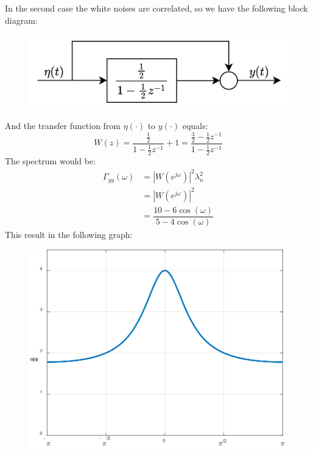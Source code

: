 In the second case the white noises are correlated, so we have the following block diagram: 
\begin{figure}[H]
    \centering
    \includegraphics[width=0.5\linewidth]{images/21block.png}
\end{figure}
And the transfer function from $\eta(\cdot)$ to $y(\cdot)$ equals:
\[W(z)=\dfrac{\frac{1}{2}}{1-\frac{1}{2}z^{-1}}+1=\dfrac{\frac{3}{2}-\frac{1}{2}z^{-1}}{1-\frac{1}{2}z^{-1}}\]
The spectrum would be: 
\begin{align*}
    \Gamma_{yy}(\omega) &=\left\lvert W(e^{j\omega}) \right\rvert^2\lambda_n^2 \\
                        &=\left\lvert W(e^{j\omega}) \right\rvert^2 \\
                        &=\dfrac{10-6\cos(\omega)}{5-4\cos(\omega)}
\end{align*}
This result in the following graph: 
\begin{figure}[H]
    \centering
    \includegraphics[width=0.5\linewidth]{images/21spec1.png}
\end{figure}